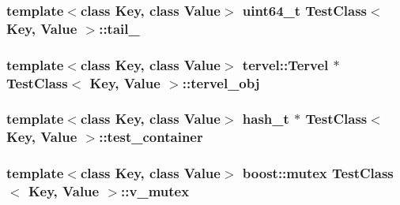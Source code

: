 \subsubsection[{tail\+\_\+}]{\setlength{\rightskip}{0pt plus 5cm}template$<$class Key, class Value$>$ uint64\+\_\+t {\bf Test\+Class}$<$ Key, {\bf Value} $>$\+::tail\+\_\+\hspace{0.3cm}{\ttfamily [private]}}\label{class_test_class_a4d2c82c8499f514936f1262c684075aa}
\hypertarget{class_test_class_a73eaea6b839e2a3171945d0f2d209b98}{}
\subsubsection[{tervel\+\_\+obj}]{\setlength{\rightskip}{0pt plus 5cm}template$<$class Key, class Value$>$ {\bf tervel\+::\+Tervel} $\ast$ {\bf Test\+Class}$<$ Key, {\bf Value} $>$\+::tervel\+\_\+obj\hspace{0.3cm}{\ttfamily [private]}}\label{class_test_class_a73eaea6b839e2a3171945d0f2d209b98}
\hypertarget{class_test_class_a94c73b5cb829bdd7e729be5668f6f6da}{}
\subsubsection[{test\+\_\+container}]{\setlength{\rightskip}{0pt plus 5cm}template$<$class Key, class Value$>$ {\bf hash\+\_\+t} $\ast$ {\bf Test\+Class}$<$ Key, {\bf Value} $>$\+::test\+\_\+container\hspace{0.3cm}{\ttfamily [private]}}\label{class_test_class_a94c73b5cb829bdd7e729be5668f6f6da}
\hypertarget{class_test_class_ac56bdd8296cec194c437ae49b63d8887}{}
\subsubsection[{v\+\_\+mutex}]{\setlength{\rightskip}{0pt plus 5cm}template$<$class Key, class Value$>$ boost\+::mutex {\bf Test\+Class}$<$ Key, {\bf Value} $>$\+::v\+\_\+mutex\hspace{0.3cm}{\ttfamily [private]}}\label{class_test_class_ac56bdd8296cec194c437ae49b63d8887}


